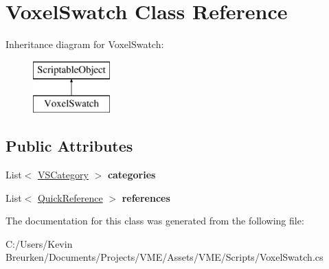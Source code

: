 \hypertarget{class_voxel_swatch}{}\section{Voxel\+Swatch Class Reference}
\label{class_voxel_swatch}
Inheritance diagram for Voxel\+Swatch\+:\begin{figure}[H]
\begin{center}
\leavevmode
\includegraphics[height=2.000000cm]{class_voxel_swatch}
\end{center}
\end{figure}
\subsection*{Public Attributes}
\begin{DoxyCompactItemize}
\item 
List$<$ \hyperlink{class_v_s_category}{V\+S\+Category} $>$ {\bfseries categories}\hypertarget{class_voxel_swatch_a658229ce22f249508cf21ad66622d1ec}{}\label{class_voxel_swatch_a658229ce22f249508cf21ad66622d1ec}

\item 
List$<$ \hyperlink{class_quick_reference}{Quick\+Reference} $>$ {\bfseries references}\hypertarget{class_voxel_swatch_a3bdd5a603812d1cc8fb0f9c493b498e4}{}\label{class_voxel_swatch_a3bdd5a603812d1cc8fb0f9c493b498e4}

\end{DoxyCompactItemize}


The documentation for this class was generated from the following file\+:\begin{DoxyCompactItemize}
\item 
C\+:/\+Users/\+Kevin Breurken/\+Documents/\+Projects/\+V\+M\+E/\+Assets/\+V\+M\+E/\+Scripts/Voxel\+Swatch.\+cs\end{DoxyCompactItemize}
